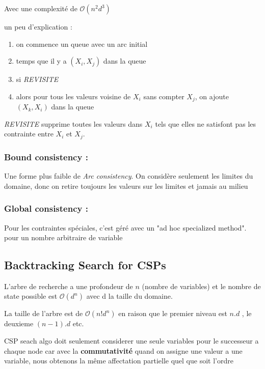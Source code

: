 			Avec une complexité de $\mathcal{O}(n^2d^3)$
			
			un peu d'explication :
			\begin{enumerate}
				\item on commence un queue avec un arc initial
				\item temps que il y a $(X_i,X_j)$ dans la queue
				\item si \textit{REVISITE}
				\item alors pour tous les valeurs voisine de $X_i$ sans compter $X_j$, on ajoute $(X_k,X_i)$ dans la queue
			\end{enumerate}
			
			\textit{REVISITE} supprime toutes les valeurs dans $X_i$ tels que elles ne satisfont pas les contrainte entre $X_i$ et $X_j$.


				
		\subsubsection{Bound consistency : }
				Une forme plus faible de \textit{Arc consistency}. On considère seulement les limites du domaine, donc on retire toujours les valeurs sur les limites et jamais au milieu
			
		\subsubsection{Global consistency : }
				Pour les contraintes spéciales, c'est géré avec un "ad hoc specialized method". pour un nombre arbitraire de variable
			
		
			
	\subsection{Backtracking Search for CSPs}
		
			
			L'arbre de recherche a une profondeur de $n$ (nombre de variables) et le nombre de state possible est $\mathcal{O}(d^n)$ avec d la taille du domaine.
			
			La taille de l'arbre est de $\mathcal{O}(n! d^n)$ en raison que le premier niveau est $n.d$ , le deuxieme $(n-1).d$ etc.
			
			CSP seach algo doit seulement considerer une seule variables pour le successeur a chaque node car avec la \textbf{commutativité} quand on assigne une valeur a une variable, nous obtenons la même affectation partielle quel que soit l'ordre
			
